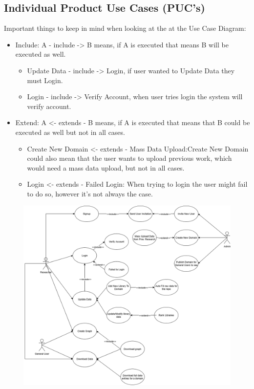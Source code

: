 \documentclass[12pt]{article}
\begin{document}
\subsection{Individual Product Use Cases (PUC's)}
Important things to keep in mind when looking at the at the Use Case Diagram:
\begin{itemize}
  \item Include: A - include -> B means, if A is executed that means B will be executed as well. 
  \begin{itemize}
    \item Update Data - include -> Login, if user wanted to Update Data they must Login.
    \item Login - include -> Verify Account, when user tries login the system will verify account.
  \end{itemize}
  \item Extend: A <- extends - B means, if A is executed that means that B could be executed as well but not in all cases.
  \begin{itemize}
    \item Create New Domain <- extends - Mass Data Upload:Create New Domain could also mean that the user wants to upload previous work, which would need a mass data upload, but not in all cases.
    \item Login <- extends - Failed Login: When trying to login the user might fail to do so, however it's not always the case.
  \end{itemize}
\end{itemize}
\begin{figure}[H]
    \centering
    \includegraphics[scale=0.45] {usecase.png}
\end{figure}
\end{document}
